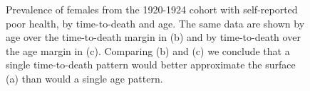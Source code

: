 \documentclass[11pt,oneside,a4paper]{article} %
\begin{document}
\begin{figure}[ht!]
    \caption{Prevalence of females from the 1920-1924 cohort with self-reported poor health, by time-to-death and age. The same data are shown by age over the time-to-death margin in (b) and by time-to-death over the age margin in (c). Comparing (b) and (c) we conclude that a single time-to-death pattern would better approximate the surface (a) than would a single age pattern.}\label{fig:srhpoortal}
\end{figure}
 
\end{document}

